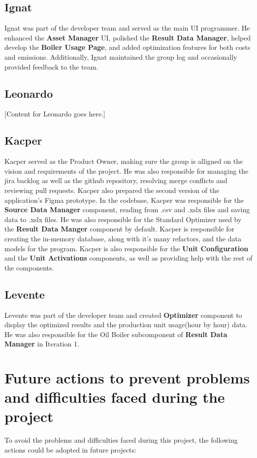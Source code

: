 \documentclass[12pt]{report}
\begin{document}
\subsection*{Ignat}
Ignat was part of the developer team and served as the main UI programmer. 
He enhanced the \textbf{Asset Manager} UI, polished the \textbf{Result Data Manager}, helped develop the \textbf{Boiler 
Usage Page}, and added optimization features for both costs and emissions. Additionally, Ignat maintained 
the group log and occasionally provided feedback to the team.

\subsection*{Leonardo}
\label{sec:nnexplanation} %
[Content for Leonardo goes here.]

\subsection*{Kacper}
Kacper served as the Product Owner, making sure the group is alligned on the vision and requirements of the project. He was also
responsible for managing the jira backlog as well as the github repository, resolving merge conflicts and reviewing pull requests.
Kacper also prepared the second version of the application's Figma prototype.
In the codebase, Kacper was responsible for the \textbf{Source Data Manager} component, reading from .csv and .xslx files and saving
data to .xslx files. He was also responsible for the Standard Optimizer used by the \textbf{Result Data Manger} component by default.
Kacper is responsible for creating the in-memory database, along with it's many refactors, and the data models for the program. 
Kacper is also responsible for the \textbf{Unit Configuration} and the \textbf{Unit Activations} components, as 
well as providing help with the rest of the components.

\subsection*{Levente}
Levente was part of the developer team and created \textbf{Optimizer} component to display the optimized results and 
the production unit usage(hour by hour) data. He was also responsible for the Oil Boiler subcomponent of \textbf{Result Data Manager} in Iteration 1.

\section{Future actions to prevent problems and difficulties faced during the project}
To avoid the problems and difficulties faced during this project, the following actions could be adopted in future projects:
\end{document}

